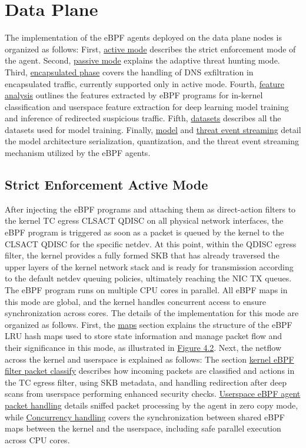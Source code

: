 \documentclass [11pt, proquest] {uwthesis}[2020/02/24]
\begin{document}
\section{Data Plane}
The implementation of the eBPF agents deployed on the data plane nodes is organized as follows: First, \hyperref[sec:active]{active mode} describes the strict enforcement mode of the agent. Second, \hyperref[sec:passive]{passive mode} explains the adaptive threat hunting mode. Third, \hyperref[sec:encap]{encapsulated phase} covers the handling of DNS exfiltration in encapsulated traffic, currently supported only in active mode. Fourth, \hyperref[sec:features]{feature analysis} outlines the features extracted by eBPF programs for in-kernel classification and userspace feature extraction for deep learning model training and inference of redirected suspicious traffic. Fifth, \hyperref[sec:dataset]{datasets} describes all the datasets used for model training. Finally, \hyperref[sec:model]{model} and \hyperref[sec:threat-event-streaming]{threat event streaming} detail the model architecture serialization, quantization, and the threat event streaming mechanism utilized by the eBPF agents.

\subsection{Strict Enforcement Active Mode}
\label{sec:active}
After injecting the eBPF programs and attaching them as direct-action filters to the kernel TC egress CLSACT QDISC on all physical network interfaces, the eBPF program is triggered as soon as a packet is queued by the kernel to the CLSACT QDISC for the specific netdev. At this point, within the QDISC egress filter, the kernel provides a fully formed SKB that has already traversed the upper layers of the kernel network stack and is ready for transmission according to the default netdev queuing policies, ultimately reaching the NIC TX queues. The eBPF program runs on multiple CPU cores in parallel. All eBPF maps in this mode are global, and the kernel handles concurrent access to ensure synchronization across cores. The details of the implementation for this mode are organized as follows. First, the \hyperref[sec:dp_eBPF_LRU_Maps_active]{maps} section explains the structure of the eBPF LRU hash maps used to store state information and manage packet flow and their significance in this mode, as illustrated in \hyperref[sec:dp_eBPF_LRU_Maps_active]{Figure 4.2}. Next, the netflow across the kernel and userspace is explained as follows:
The section \hyperref[active:sec1]{kernel eBPF filter packet classify} describes how incoming packets are classified and actions in the TC egress filter, using SKB metadata, and handling redirection after deep scans from userspace performing enhanced security checks. \hyperref[active:sec3]{Userspace eBPF agent packet handling} details sniffed packet processing by the agent in zero copy mode, while \hyperref[active:sec3]{Concurrency handling} covers the synchronization between shared eBPF maps between the kernel and the userspace, including safe parallel execution across CPU cores.
\end{document}
